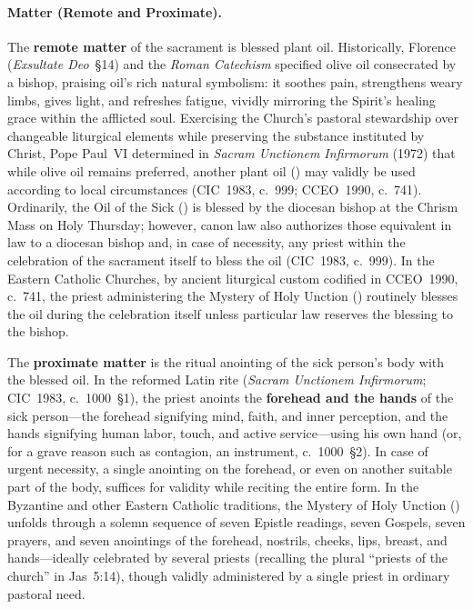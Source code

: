 \paragraph{Matter (Remote and Proximate).}
The \textbf{remote matter} of the sacrament is blessed plant oil. Historically, Florence (\emph{Exsultate Deo}~\S14) and the \emph{Roman Catechism} specified olive oil consecrated by a bishop, praising oil's rich natural symbolism: it soothes pain, strengthens weary limbs, gives light, and refreshes fatigue, vividly mirroring the Spirit's healing grace within the afflicted soul. Exercising the Church's pastoral stewardship over changeable liturgical elements while preserving the substance instituted by Christ, Pope Paul~VI determined in \emph{Sacram Unctionem Infirmorum} (1972) that while olive oil remains preferred, another plant oil () may validly be used according to local circumstances (CIC~1983, c.~999; CCEO~1990, c.~741). Ordinarily, the Oil of the Sick () is blessed by the diocesan bishop at the Chrism Mass on Holy Thursday; however, canon law also authorizes those equivalent in law to a diocesan bishop and, in case of necessity, any priest within the celebration of the sacrament itself to bless the oil (CIC~1983, c.~999). In the Eastern Catholic Churches, by ancient liturgical custom codified in CCEO~1990, c.~741, the priest administering the Mystery of Holy Unction () routinely blesses the oil during the celebration itself unless particular law reserves the blessing to the bishop.

The \textbf{proximate matter} is the ritual anointing of the sick person's body with the blessed oil. In the reformed Latin rite (\emph{Sacram Unctionem Infirmorum}; CIC~1983, c.~1000~\S1), the priest anoints the \textbf{forehead and the hands} of the sick person---the forehead signifying mind, faith, and inner perception, and the hands signifying human labor, touch, and active service---using his own hand (or, for a grave reason such as contagion, an instrument, c.~1000~\S2). In case of urgent necessity, a single anointing on the forehead, or even on another suitable part of the body, suffices for validity while reciting the entire form. In the Byzantine and other Eastern Catholic traditions, the Mystery of Holy Unction () unfolds through a solemn sequence of seven Epistle readings, seven Gospels, seven prayers, and seven anointings of the forehead, nostrils, cheeks, lips, breast, and hands---ideally celebrated by several priests (recalling the plural ``priests of the church'' in Jas~5:14), though validly administered by a single priest in ordinary pastoral need.

